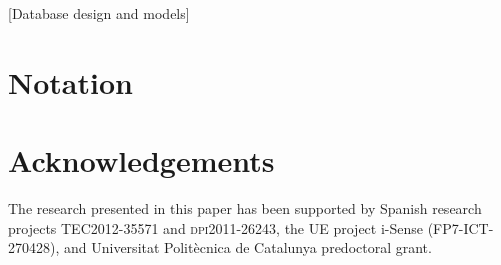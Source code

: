 \documentclass{acm_proc_article-sp}
\begin{document}
\begin{abstract}
  In this paper we define a model for multiresolution time series
  database management systems. These systems store each time series
  lossy compressed by extracting different resolutions and attribute
  aggregations. Then time series are stored compactly, with finite
  capacity and with its temporal attribute managed consistently.

  For many applications it is of primary relevance that database
  systems support time series.  We root our theory firmly on set and
  relational algebra together with some time series analysis specific
  properties that can be problematic when manipulating them.
  Furthermore, we use the time-order acquisition characteristic of
  time series to simplify its treatment by stream-like computations in
  order to achieve fast pre-computed queries and visualisations.
\end{abstract}

[Database design and models]
















\glsaddall
\appendix
\section{Notation}
\printglossary[type=notation,style=estil-notation]






\section*{Acknowledgements}

The research presented in this paper has been supported by Spanish
research projects \textsc{TEC2012-35571} and \textsc{dpi2011-26243},
the UE project i-Sense ({\small FP7-ICT-270428}), and Universitat
Polit\`{e}cnica de Catalunya predoctoral grant.



\printbibliography[
 title={REFERENCES},
]




\end{document}
